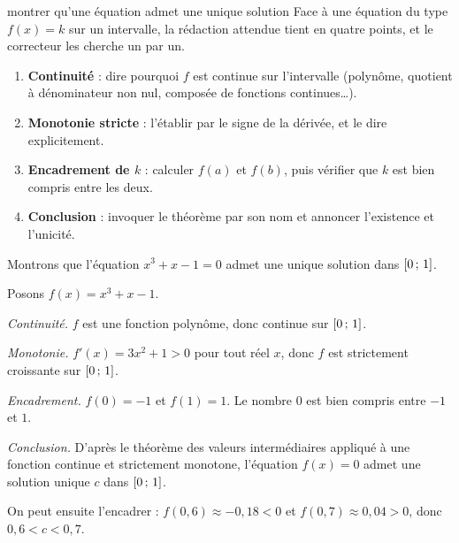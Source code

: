 \begin{methode}{montrer qu'une équation admet une unique solution}
Face à une équation du type $f(x) = k$ sur un intervalle, la rédaction attendue
tient en quatre points, et le correcteur les cherche un par un.

\begin{enumerate}[label=\textbf{\arabic*.}, leftmargin=*, itemsep=0.3em]
  \item \textbf{Continuité} : dire pourquoi $f$ est continue sur l'intervalle
        (polynôme, quotient à dénominateur non nul, composée de fonctions
        continues\ldots).
  \item \textbf{Monotonie stricte} : l'établir par le signe de la dérivée,
        et le dire explicitement.
  \item \textbf{Encadrement de $k$} : calculer $f(a)$ et $f(b)$, puis vérifier
        que $k$ est bien compris entre les deux.
  \item \textbf{Conclusion} : invoquer le théorème par son nom et annoncer
        l'existence et l'unicité.
\end{enumerate}
\end{methode}

\begin{exemple}
Montrons que l'équation $x^{3} + x - 1 = 0$ admet une unique solution dans
$\left[0\,;\,1\right]$.

Posons $f(x) = x^{3} + x - 1$.

\smallskip
\emph{Continuité.} $f$ est une fonction polynôme, donc continue sur
$\left[0\,;\,1\right]$.

\smallskip
\emph{Monotonie.} $f'(x) = 3x^{2} + 1 > 0$ pour tout réel $x$, donc $f$ est
strictement croissante sur $\left[0\,;\,1\right]$.

\smallskip
\emph{Encadrement.} $f(0) = -1$ et $f(1) = 1$. Le nombre $0$ est bien compris
entre $-1$ et $1$.

\smallskip
\emph{Conclusion.} D'après le théorème des valeurs intermédiaires appliqué à
une fonction continue et strictement monotone, l'équation $f(x) = 0$ admet une
solution unique $c$ dans $\left[0\,;\,1\right]$.

\smallskip
On peut ensuite l'encadrer : $f(0{,}6) \approx -0{,}18 < 0$ et
$f(0{,}7) \approx 0{,}04 > 0$, donc $0{,}6 < c < 0{,}7$.
\end{exemple}


